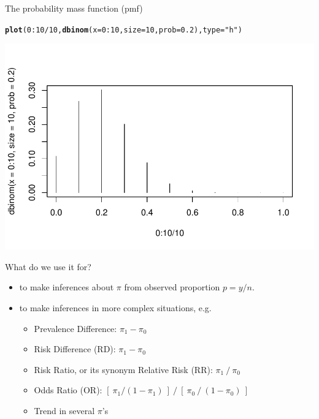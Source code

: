\documentclass[10pt,handout]{beamer}\usepackage[]{graphicx}\usepackage[]{color}
\makeatletter
\def\maxwidth{ %
  \ifdim\Gin@nat@width>\linewidth
    \linewidth
  \else
    \Gin@nat@width
  \fi
}
\newcommand{\hlnum}[1]{\textcolor[rgb]{0.686,0.059,0.569}{#1}}%
\newcommand{\hlstr}[1]{\textcolor[rgb]{0.192,0.494,0.8}{#1}}%
\newcommand{\hlopt}[1]{\textcolor[rgb]{0,0,0}{#1}}%
\newcommand{\hlstd}[1]{\textcolor[rgb]{0.345,0.345,0.345}{#1}}%
\newcommand{\hlkwc}[1]{\textcolor[rgb]{0.333,0.667,0.333}{#1}}%
\newcommand{\hlkwd}[1]{\textcolor[rgb]{0.737,0.353,0.396}{\textbf{#1}}}%
\newenvironment{kframe}{%
 \def\at@end@of@kframe{}%
 \ifinner\ifhmode%
  \def\at@end@of@kframe{\end{minipage}}%
  \begin{minipage}{\columnwidth}%
 \fi\fi%
 \def\FrameCommand##1{\hskip\@totalleftmargin \hskip-\fboxsep
 \colorbox{shadecolor}{##1}\hskip-\fboxsep
     \hskip-\linewidth \hskip-\@totalleftmargin \hskip\columnwidth}%
 \MakeFramed {\advance\hsize-\width
   \@totalleftmargin\z@ \linewidth\hsize
   \@setminipage}}%
 {\par\unskip\endMakeFramed%
 \at@end@of@kframe}
\newenvironment{knitrout}{}{} %
\makeatother
\begin{document}
\begin{frame}[fragile]{The probability mass function (pmf)}
	
\begin{knitrout}\tiny
{}\color{fgcolor}\begin{kframe}
\begin{alltt}
\hlkwd{plot}\hlstd{(}\hlnum{0}\hlopt{:}\hlnum{10}\hlopt{/}\hlnum{10}\hlstd{,} \hlkwd{dbinom}\hlstd{(}\hlkwc{x} \hlstd{=} \hlnum{0}\hlopt{:}\hlnum{10}\hlstd{,} \hlkwc{size} \hlstd{=} \hlnum{10}\hlstd{,} \hlkwc{prob} \hlstd{=} \hlnum{0.2}\hlstd{),} \hlkwc{type} \hlstd{=} \hlstr{"h"}\hlstd{)}
\end{alltt}
\end{kframe}

{\centering \includegraphics[width=\maxwidth]{figure/unnamed-chunk-5-1} 

}


\end{knitrout}
\end{frame}

\begin{frame}[fragile]{What do we use it for?}
	\small
	\begin{itemize}
		\setlength\itemsep{0.7em}
		\item to make inferences about $\pi$ from  observed  proportion $p= y/n.$ \pause 
		\item to make inferences in more complex situations, e.g. 
		\begin{itemize}
			\setlength\itemsep{0.4em}
			\item Prevalence Difference: $\pi _{1} - \pi _{0}$
			\item Risk Difference (RD): $\pi _{1} - \pi _{0}$
			\item Risk Ratio, or its synonym Relative Risk (RR): $\pi _{1}\:/\:\pi _{0}$
			\item Odds Ratio (OR): $[\: \pi _{1}/(1-\pi _{1})\:] \: / \: [\: \pi _{0}\: / \: (1-\pi _{0}) \: ]$
			\item Trend in several $\pi $'s
		\end{itemize}
	\end{itemize}
\end{frame}
\end{document}
